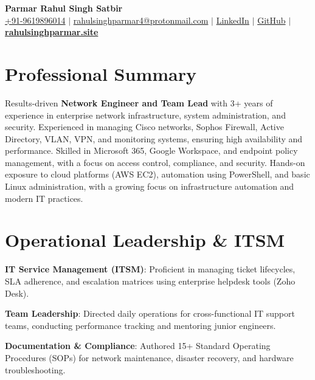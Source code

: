 \documentclass[letterpaper,10pt]{article}
\begin{document}
\begin{center}
    \textbf{\Huge Parmar Rahul Singh Satbir} \\ \vspace{5pt}
    \small \href{tel:+919619896014}{+91-9619896014} $|$ 
    \href{mailto:rahulsinghparmar4@protonmail.com}{rahulsinghparmar4@protonmail.com} $|$ 
    \href{https://www.linkedin.com/in/rahulsinghparmar4/}{LinkedIn} $|$
    \href{https://github.com/RahulSinghParmar}{GitHub} $|$
    \href{https://rahulsinghparmar.site/}{\textbf{rahulsinghparmar.site}}
\end{center}

\section{Professional Summary}
Results-driven \textbf{Network Engineer and Team Lead} with 3+ years of experience in enterprise network infrastructure, system administration, and security. 
Experienced in managing Cisco networks, Sophos Firewall, Active Directory, VLAN, VPN, and monitoring systems, ensuring high availability and performance. 
Skilled in Microsoft 365, Google Workspace, and endpoint policy management, with a focus on access control, compliance, and security. 
Hands-on exposure to cloud platforms (AWS EC2), automation using PowerShell, and basic Linux administration, with a growing focus on infrastructure automation and modern IT practices.

\section{Operational Leadership \& ITSM}
 \begin{itemize}[leftmargin=0.15in]
    \small{\item{
     \textbf{IT Service Management (ITSM)}{: Proficient in managing ticket lifecycles, SLA adherence, and escalation matrices using enterprise helpdesk tools (Zoho Desk).}
    }}
    \small{\item{
     \textbf{Team Leadership}{: Directed daily operations for cross-functional IT support teams, conducting performance tracking and mentoring junior engineers.}
    }}
    \small{\item{
     \textbf{Documentation \& Compliance}{: Authored 15+ Standard Operating Procedures (SOPs) for network maintenance, disaster recovery, and hardware troubleshooting.}
    }}
 \end{itemize}
\end{document}
